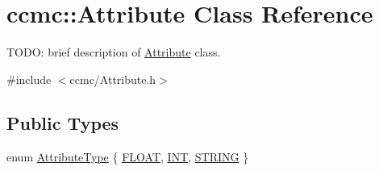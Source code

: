 \hypertarget{classccmc_1_1_attribute}{\section{ccmc\-:\-:Attribute Class Reference}
\label{classccmc_1_1_attribute}
}


T\-O\-D\-O\-: brief description of \hyperlink{classccmc_1_1_attribute}{Attribute} class.  




{\ttfamily \#include $<$ccmc/\-Attribute.\-h$>$}

\subsection*{Public Types}
\begin{DoxyCompactItemize}
\item 
enum \hyperlink{classccmc_1_1_attribute_a4b2de185d21d77a8dd84ed192c08e6dc}{Attribute\-Type} \{ \hyperlink{classccmc_1_1_attribute_a4b2de185d21d77a8dd84ed192c08e6dca7d2598b6d93c726b54c97a0a69bf4d91}{F\-L\-O\-A\-T}, 
\hyperlink{classccmc_1_1_attribute_a4b2de185d21d77a8dd84ed192c08e6dcafc98ae76f4fe5d5f1f2ab252b372ca5f}{I\-N\-T}, 
\hyperlink{classccmc_1_1_attribute_a4b2de185d21d77a8dd84ed192c08e6dcaea0fc43df5a3bffd5e848ecfe252f306}{S\-T\-R\-I\-N\-G}
 \}
\end{DoxyCompactItemize}
